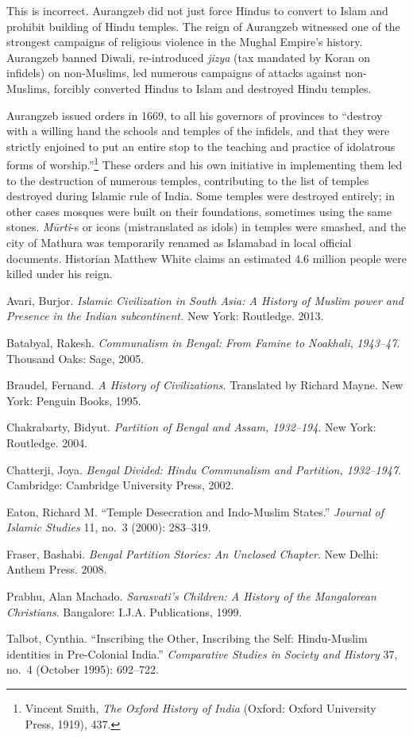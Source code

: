 This is incorrect. Aurangzeb did not just force Hindus to convert to Islam and prohibit building of Hindu temples. The reign of Aurangzeb witnessed one of the strongest campaigns of religious violence in the Mughal Empire's history. Aurangzeb banned Diwali, re-introduced \textit{jizya} (tax mandated by Koran on infidels) on non-Muslims, led numerous campaigns of attacks against non-Muslims, forcibly converted Hindus to Islam and destroyed Hindu temples.

Aurangzeb issued orders in 1669, to all his governors of provinces to “destroy with a willing hand the schools and temples of the infidels, and that they were strictly enjoined to put an entire stop to the teaching and practice of idolatrous forms of worship.”\footnote{Vincent Smith, \textit{The Oxford History of India} (Oxford: Oxford University Press, 1919), 437.} These orders and his own initiative in implementing them led to the destruction of numerous temples, contributing to the list of temples destroyed during Islamic rule of India. Some temples were destroyed entirely; in other cases mosques were built on their foundations, sometimes using the same stones. \textit{Mūrti}-s or icons (mistranslated as idols) in temples were smashed, and the city of Mathura was temporarily renamed as Islamabad in local official documents. Historian Matthew White claims an estimated 4.6 million people were killed under his reign. 

\begin{thebibliography}{99}
 Avari, Burjor. \textit{Islamic Civilization in South Asia: A History of Muslim power and Presence in the Indian subcontinent.} New York: Routledge. 2013.

 Batabyal, Rakesh. \textit{Communalism in Bengal: From Famine to Noakhali}, \textit{1943--47}. Thousand Oaks: Sage, 2005. 

 Braudel, Fernand. \textit{A History of Civilizations}. Translated by Richard Mayne. New York: Penguin Books, 1995.

 Chakrabarty, Bidyut. \textit{Partition of Bengal and Assam, 1932--194}. New York: Routledge. 2004. 

 Chatterji, Joya. \textit{Bengal Divided: Hindu Communalism and Partition, 1932--1947}. Cambridge: Cambridge University Press, 2002.

 Eaton, Richard M. “Temple Desecration and Indo-Muslim States.” \textit{Journal of Islamic Studies} 11, no.\ 3 (2000): 283--319.

 Fraser, Bashabi. \textit{Bengal Partition Stories: An Unclosed Chapter}. New Delhi: Anthem Press. 2008. 

 Prabhu, Alan Machado. \textit{Sarasvati's Children: A History of the Mangalorean Christians}. Bangalore: I.J.A. Publications, 1999.

 Talbot, Cynthia. “Inscribing the Other, Inscribing the Self: Hindu-Muslim identities in Pre-Colonial India.” \textit{Comparative Studies in Society and History} 37, no.\ 4 (October 1995): 692--722.
\end{thebibliography}
